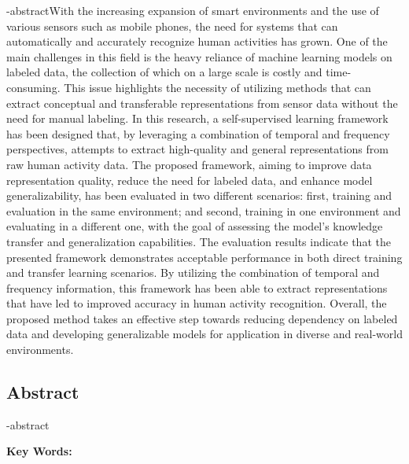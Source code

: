 
\en-abstract{With the increasing expansion of smart environments and the use of various sensors such as mobile phones, the need for systems that can automatically and accurately recognize human activities has grown. One of the main challenges in this field is the heavy reliance of machine learning models on labeled data, the collection of which on a large scale is costly and time-consuming. This issue highlights the necessity of utilizing methods that can extract conceptual and transferable representations from sensor data without the need for manual labeling. In this research, a self-supervised learning framework has been designed that, by leveraging a combination of temporal and frequency perspectives, attempts to extract high-quality and general representations from raw human activity data. The proposed framework, aiming to improve data representation quality, reduce the need for labeled data, and enhance model generalizability, has been evaluated in two different scenarios: first, training and evaluation in the same environment; and second, training in one environment and evaluating in a different one, with the goal of assessing the model's knowledge transfer and generalization capabilities. The evaluation results indicate that the presented framework demonstrates acceptable performance in both direct training and transfer learning scenarios. By utilizing the combination of temporal and frequency information, this framework has been able to extract representations that have led to improved accuracy in human activity recognition. Overall, the proposed method takes an effective step towards reducing dependency on labeled data and developing generalizable models for application in diverse and real-world environments.}

\newpage
\thispagestyle{empty}
\begin{latin}
\section*{\LARGE\centering Abstract}

\een-abstract

\vspace*{.5cm}
{\noindent\large\textbf{Key Words:}}\par
\vspace*{.5cm}
\noindent\elatinkeywords
\end{latin}